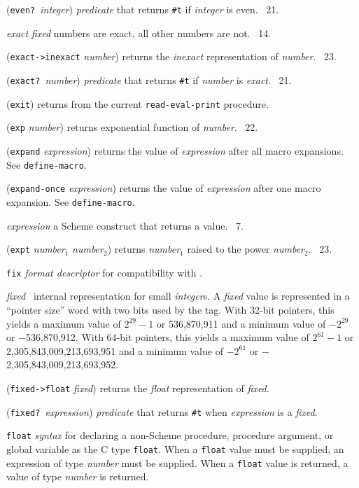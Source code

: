 \documentclass[10pt,twocolumn]{article}
\begin{document}
(\texttt{even?}\ \emph{integer}) \emph{predicate} that returns
\texttt{\#t} if \emph{integer} is even.  \RRRRRS~21.

\emph{exact} \qquad \emph{fixed} numbers are exact, all other numbers
are not.  \RRRRRS~14.

(\texttt{exact->inexact} \emph{number}) returns the \emph{inexact}
representation of \emph{number}. \RRRRRS~23.

(\texttt{exact?}\ \emph{number}) \emph{predicate} that returns
\texttt{\#t} if \emph{number} is \emph{exact}.  \RRRRRS~21.

(\texttt{exit}) returns from the current \texttt{read-eval-print}
procedure.

(\texttt{exp} \emph{number}) returns exponential function of
\emph{number}.  \RRRRRS~22.

(\texttt{expand} \emph{expression}) returns the value of
\emph{expression} after all macro expansions.  See
\texttt{define-macro}.

(\texttt{expand-once} \emph{expression}) returns the value of
\emph{expression} after one macro expansion.  See
\texttt{define-macro}.

\emph{expression} a Scheme construct that returns a value.  \RRRRRS~7.

(\texttt{expt} \emph{number}$_1$ \emph{number}$_2$) returns
\emph{number}$_1$ raised to the power \emph{number}$_2$.  \RRRRRS~23.

\texttt{fix} \emph{format descriptor} for compatibility with \RRRRS.

\emph{fixed} \StoC\ internal representation for small \emph{integer}s.
A \emph{fixed} value is represented in a ``pointer size'' word with
two bits used by the tag.  With 32-bit pointers, this yields a maximum
value of $2^{29}-1$ or 536,870,911 and a minimum value of $-2^{29}$ or
$-$536,870,912.  With 64-bit pointers, this yields a maximum value of
$2^{61}-1$ or 2,305,843,009,213,693,951 and a minimum value of
$-2^{61}$ or $-$2,305,843,009,213,693,952.

(\texttt{fixed->float} \emph{fixed}) returns the \emph{float}
representation of \emph{fixed}.

(\texttt{fixed?}\ \emph{expression}) \emph{predicate} that returns
\texttt{\#t} when \emph{expression} is a \emph{fixed}.

\texttt{float} \emph{syntax} for declaring a non-Scheme procedure,
procedure argument, or global variable as the C type
\texttt{float}. When a \texttt{float} value must be supplied, an
expression of type \emph{number} must be supplied.  When a
\texttt{float} value is returned, a value of type \emph{number} is
returned.
\end{document}
